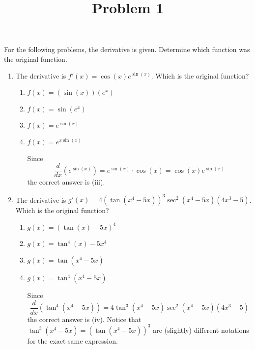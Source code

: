 \documentclass{ximera}
\title[Problem 1]{Problem 1}
\begin{document}
\begin{abstract} \end{abstract}
\maketitle


\begin{problem}
For the following problems, the derivative is given.  Determine which function was the original function.
	\begin{enumerate}
	
		\item  The derivative is $f'(x) = \cos (x) e^{\sin (x)}$.  Which is the original function?
		
			\begin{enumerate}
			\item  $f(x) = (\sin(x))(e^x)$
			\item  $f(x) = \sin (e^x)$
			\item  $f(x) = e^{\sin(x)}$
			\item  $f(x) = e^{x \sin(x)}$

				\begin{explanation}
				Since
				$$ \dfrac{d}{dx} \left( e^{\sin(x)} \right) = e^{\sin(x)} \cdot \cos(x) = \cos(x) e^{\sin(x)} $$
				the correct answer is (iii).  
				\end{explanation}
				
			\end{enumerate}
			
			\item  The derivative is $g'(x) = 4 \left( \tan (x^4 - 5x) \right)^3 \sec^2(x^4-5x)(4x^3-5)$.  Which is the original function?
		
			\begin{enumerate}
			
			\item  $g(x) = \left( \tan(x) - 5x \right)^4$
			\item  $g(x) = \tan^4(x) - 5x^4$
			\item  $g(x) = \tan(x^4 - 5x)$
			\item  $g(x) = \tan^4(x^4-5x)$
			
				\begin{explanation}
				Since 
				$$\dfrac{d}{dx} \left( \tan^4(x^4-5x) \right) = 4 \tan^3(x^4-5x) \sec^2(x^4-5x) (4x^3-5)$$ 
				the correct answer is (iv).  Notice that $\tan^3(x^4-5x) = \left( \tan(x^4-5x) \right)^3$ are (slightly) different notations for the exact same expression.
				\end{explanation}
				
			\end{enumerate}
\end{enumerate}
\end{problem}
\end{document}
